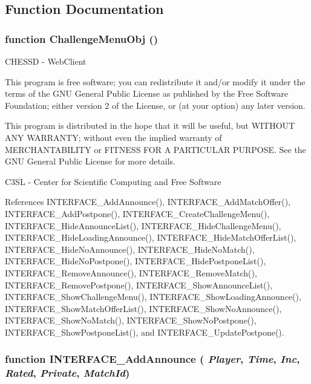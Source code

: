 \subsection{Function Documentation}
\subsubsection[ChallengeMenuObj]{\setlength{\rightskip}{0pt plus 5cm}function ChallengeMenuObj ()}\label{challengemenu_8js_d54b2cc938fd011a1592a154367bb0b1}


CHESSD - WebClient

This program is free software; you can redistribute it and/or modify it under the terms of the GNU General Public License as published by the Free Software Foundation; either version 2 of the License, or (at your option) any later version.

This program is distributed in the hope that it will be useful, but WITHOUT ANY WARRANTY; without even the implied warranty of MERCHANTABILITY or FITNESS FOR A PARTICULAR PURPOSE. See the GNU General Public License for more details.

C3SL - Center for Scientific Computing and Free Software 

References INTERFACE\_\-AddAnnounce(), INTERFACE\_\-AddMatchOffer(), INTERFACE\_\-AddPostpone(), INTERFACE\_\-CreateChallengeMenu(), INTERFACE\_\-HideAnnounceList(), INTERFACE\_\-HideChallengeMenu(), INTERFACE\_\-HideLoadingAnnounce(), INTERFACE\_\-HideMatchOfferList(), INTERFACE\_\-HideNoAnnounce(), INTERFACE\_\-HideNoMatch(), INTERFACE\_\-HideNoPostpone(), INTERFACE\_\-HidePostponeList(), INTERFACE\_\-RemoveAnnounce(), INTERFACE\_\-RemoveMatch(), INTERFACE\_\-RemovePostpone(), INTERFACE\_\-ShowAnnounceList(), INTERFACE\_\-ShowChallengeMenu(), INTERFACE\_\-ShowLoadingAnnounce(), INTERFACE\_\-ShowMatchOfferList(), INTERFACE\_\-ShowNoAnnounce(), INTERFACE\_\-ShowNoMatch(), INTERFACE\_\-ShowNoPostpone(), INTERFACE\_\-ShowPostponeList(), and INTERFACE\_\-UpdatePostpone().
\subsubsection[INTERFACE\_\-AddAnnounce]{\setlength{\rightskip}{0pt plus 5cm}function INTERFACE\_\-AddAnnounce ( {\em Player}, \/   {\em Time}, \/   {\em Inc}, \/   {\em Rated}, \/   {\em Private}, \/   {\em MatchId})}\label{challengemenu_8js_97c09d3f3e984dfa1ae86bb2baac6d39}




